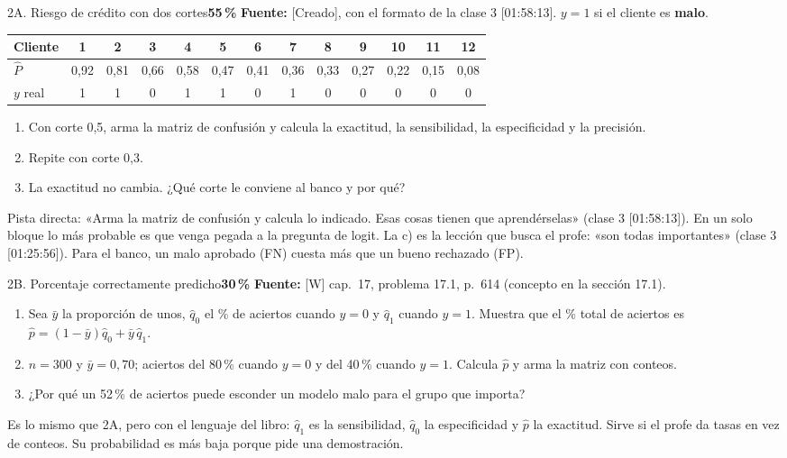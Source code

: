 \documentclass[11pt]{article}
\newcommand{\prob}[1]{\colorbox{red!15}{\textbf{#1}}}
\newcommand{\fuente}[1]{{\small\textcolor{blue!50!black}{\textbf{Fuente:} #1}}\par}
\begin{document}
\begin{ej}{2A. Riesgo de crédito con dos cortes}{\prob{55\,\%}}
\fuente{[Creado], con el formato de la clase 3 [01:58:13]. $y=1$ si el cliente es \textbf{malo}.}
\begin{center}\small\setlength{\tabcolsep}{4pt}
\begin{tabular}{l*{12}{c}}\toprule
Cliente & 1 & 2 & 3 & 4 & 5 & 6 & 7 & 8 & 9 & 10 & 11 & 12\\\midrule
$\hat P$ & 0,92 & 0,81 & 0,66 & 0,58 & 0,47 & 0,41 & 0,36 & 0,33 & 0,27 & 0,22 & 0,15 & 0,08\\
$y$ real & 1 & 1 & 0 & 1 & 1 & 0 & 1 & 0 & 0 & 0 & 0 & 0\\\bottomrule
\end{tabular}
\end{center}
\begin{enumerate}[label=\alph*),itemsep=0pt,topsep=2pt]
\item Con corte 0,5, arma la matriz de confusión y calcula la exactitud, la sensibilidad, la especificidad y la precisión.
\item Repite con corte 0,3.
\item La exactitud no cambia. ¿Qué corte le conviene al banco y por qué?
\end{enumerate}
\end{ej}
\begin{porque}
Pista directa: «Arma la matriz de confusión y calcula lo indicado. Esas cosas tienen que aprendérselas» (clase 3 [01:58:13]). En un solo bloque lo más probable es que venga pegada a la pregunta de logit. La c) es la lección que busca el profe: «son todas importantes» (clase 3 [01:25:56]). Para el banco, un malo aprobado (FN) cuesta más que un bueno rechazado (FP).
\end{porque}

\begin{ej}{2B. Porcentaje correctamente predicho}{\prob{30\,\%}}
\fuente{[W] cap.~17, problema 17.1, p.~614 (concepto en la sección 17.1).}
\begin{enumerate}[label=\alph*),itemsep=0pt,topsep=2pt]
\item Sea $\bar y$ la proporción de unos, $\hat q_0$ el \% de aciertos cuando $y=0$ y $\hat q_1$ cuando $y=1$. Muestra que el \% total de aciertos es $\hat p=(1-\bar y)\hat q_0+\bar y\,\hat q_1$.
\item $n=300$ y $\bar y=0{,}70$; aciertos del 80\,\% cuando $y=0$ y del 40\,\% cuando $y=1$. Calcula $\hat p$ y arma la matriz con conteos.
\item ¿Por qué un 52\,\% de aciertos puede esconder un modelo malo para el grupo que importa?
\end{enumerate}
\end{ej}
\begin{porque}
Es lo mismo que 2A, pero con el lenguaje del libro: $\hat q_1$ es la sensibilidad, $\hat q_0$ la especificidad y $\hat p$ la exactitud. Sirve si el profe da tasas en vez de conteos. Su probabilidad es más baja porque pide una demostración.
\end{porque}
\end{document}
